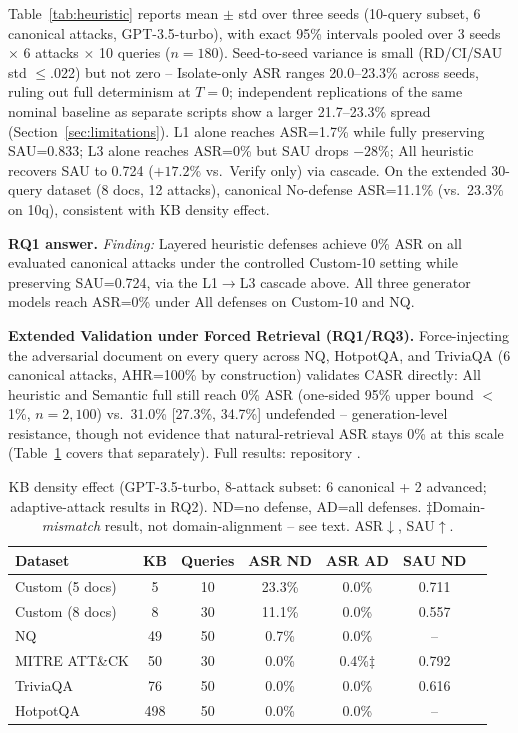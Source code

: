 \documentclass[conference]{IEEEtran}
\begin{document}
Table~\ref{tab:heuristic} reports mean $\pm$ std over three seeds (10-query subset, 6 canonical attacks, GPT-3.5-turbo), with exact 95\% intervals pooled over 3 seeds $\times$ 6 attacks $\times$ 10 queries ($n=180$). Seed-to-seed variance is small (RD/CI/SAU std $\leq$.022) but not zero -- Isolate-only ASR ranges 20.0--23.3\% across seeds, ruling out full determinism at $T=0$; independent replications of the same nominal baseline as separate scripts show a larger 21.7--23.3\% spread (Section~\ref{sec:limitations}). L1 alone reaches ASR=1.7\% while fully preserving SAU=0.833; L3 alone reaches ASR=0\% but SAU drops $-28\%$; All heuristic recovers SAU to 0.724 ($+17.2\%$ vs.\ Verify only) via cascade. On the extended 30-query dataset (8 docs, 12 attacks), canonical No-defense ASR=11.1\% (vs.\ 23.3\% on 10q), consistent with KB density effect.

\textbf{RQ1 answer.} \textit{Finding:} Layered heuristic defenses achieve 0\% ASR on all evaluated canonical attacks under the controlled Custom-10 setting while preserving SAU=0.724, via the L1$\to$L3 cascade above. All three generator models reach ASR=0\% under All defenses on Custom-10 and NQ.

\textbf{Extended Validation under Forced Retrieval (RQ1/RQ3).} Force-injecting the adversarial document on every query across NQ, HotpotQA, and TriviaQA (6 canonical attacks, AHR=100\% by construction) validates CASR directly: All heuristic and Semantic full still reach 0\% ASR (one-sided 95\% upper bound $<$1\%, $n=2{,}100$) vs.\ 31.0\% [27.3\%, 34.7\%] undefended -- generation-level resistance, though not evidence that natural-retrieval ASR stays 0\% at this scale (Table~\ref{tab:kbdensity} covers that separately). Full results: repository \cite{ameur2026repo}.

\begin{table}[t]
\centering
\caption{KB density effect (GPT-3.5-turbo, 8-attack subset: 6 canonical + 2 advanced; adaptive-attack results in RQ2). ND=no defense, AD=all defenses. $\ddagger$Domain-\emph{mismatch} result, not domain-alignment -- see text. ASR$\downarrow$, SAU$\uparrow$.}
\label{tab:kbdensity}
\footnotesize
\begin{tabular}{lcccccc}
\toprule
Dataset & KB & Queries & ASR ND & ASR AD & SAU ND \\
\midrule
Custom (5 docs) & 5 & 10 & 23.3\% & 0.0\% & 0.711 \\
Custom (8 docs) & 8 & 30 & 11.1\% & 0.0\% & 0.557 \\
NQ & 49 & 50 & 0.7\% & 0.0\% & -- \\
MITRE ATT\&CK & 50 & 30 & 0.0\% & 0.4\%$\ddagger$ & 0.792 \\
TriviaQA & 76 & 50 & 0.0\% & 0.0\% & 0.616 \\
HotpotQA & 498 & 50 & 0.0\% & 0.0\% & -- \\
\bottomrule
\end{tabular}
\end{table}
\end{document}
